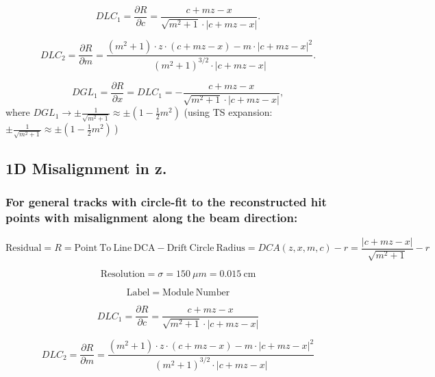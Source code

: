 \documentclass[a4paper,11pt]{article}
\begin{document}
\begin{equation}
DLC_1 = \frac{\partial R}{\partial c} = \frac{ c+mz-x }  { \sqrt{m^2+1} \cdot |c+mz-x| }.
\end{equation}

\begin{equation}
DLC_2 = \frac{ \partial R}{\partial m} = \frac{ (m^2+1)\cdot z\cdot(c+mz-x) - m\cdot |c+mz-x|^2 }{ (m^2+1)^{3/2} \cdot |c+mz-x|  }.
\end{equation}

\begin{equation}	
DGL_1 = \frac{\partial R}{\partial x} = DLC_1 = - \frac{ c+mz-x }  { \sqrt{m^2+1} \cdot |c+mz-x| },
\end{equation}
where $DGL_1 \rightarrow \pm \frac{1}{\sqrt{m^2+1}} \approx \pm (1-\frac{1}{2}m^2) $
(using TS expansion: $\pm \frac{1}{\sqrt{m^2+1}} \approx \pm (1-\frac{1}{2}m^2) \ $)

\clearpage

\subsection{1D Misalignment in z.}
\subsubsection{For general tracks with circle-fit to the reconstructed hit points with misalignment along the beam direction:}

\begin{equation}	
\mathrm{Residual}= R =\mathrm{Point \ To \ Line \ DCA} - \mathrm{Drift \ Circle \ Radius} = DCA(z,x,m,c) - r = \frac{ |c+mz-x| }  { \sqrt{m^2+1} } -r
\end{equation}


\begin{equation}	
\mathrm{Resolution} = \sigma = 150 \ \mu m = 0.015 \ \mathrm{cm}
\end{equation}

\begin{equation}	
\mathrm{Label}= \mathrm{Module \ Number}
\end{equation}

\begin{equation}
DLC_1 = \frac{\partial R}{\partial c} = \frac{ c+mz-x }  { \sqrt{m^2+1} \cdot |c+mz-x| }
\end{equation}

\begin{equation}
DLC_2 = \frac{ \partial R}{\partial m} = \frac{ (m^2+1)\cdot z\cdot(c+mz-x) - m\cdot |c+mz-x|^2 }{ (m^2+1)^{3/2} \cdot |c+mz-x|  }
\end{equation}
\end{document}
